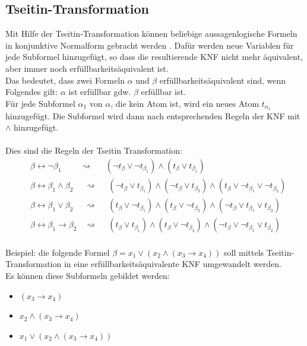 \documentclass[a4,abstract=on]{scrartcl}
\begin{document}
\subsection{Tseitin-Transformation}
Mit Hilfe der Tseitin-Transformation können beliebige aussagenlogische Formeln in konjunktive Normalform gebracht werden \cite [vgl.][]{tseitin}. Dafür werden neue Variablen für jede Subformel hinzugefügt, so dass die resultierende KNF nicht mehr äquivalent, aber immer noch erfüllbarkeitsäquivalent ist. \\
Das bedeutet, dass zwei Formeln $\alpha$ und $\beta$ erfüllbarkeitsäquivalent sind, wenn Folgendes gilt:
$\alpha$ ist erfüllbar gdw. $\beta$ erfüllbar ist.
\ \\
Für jede Subformel $\alpha_1$ von $\alpha$, die kein Atom ist, wird ein neues Atom $t_{\alpha_1}$ hinzugefügt. Die Subformel wird dann nach entsprechenden Regeln der KNF mit $\wedge$ hinzugefügt.\\
\ \\
Dies sind die Regeln der Tseitin Transformation:
\begin{align*}
&\beta \leftrightarrow\neg \beta_1 {~~~~~~~~~~}\rightsquigarrow{~~~~~~~} (\neg t_\beta \vee \neg t_{\beta_1 }) \wedge (t_\beta \vee t_{\beta_1})\\
&\beta \leftrightarrow \beta_1 \wedge \beta_2 {~~~~~~}\rightsquigarrow{~~~~~~} (\neg t_\beta \vee  t_{\beta_1 }) \wedge (\neg t_\beta \vee t_{\beta_2}) \wedge (t_\beta \vee \neg t_{\beta_1} \vee \neg t_{\beta_2})\\
&\beta \leftrightarrow \beta_1 \vee \beta_2 {~~~~~~}\rightsquigarrow{~~~~~~} (t_\beta \vee  \neg t_{\beta_1 }) \wedge (t_\beta \vee \neg t_{\beta_2}) \wedge (\neg t_\beta \vee t_{\beta_1} \vee t_{\beta_2})\\
&\beta \leftrightarrow \beta_1 \rightarrow \beta_2 {~~~~}\rightsquigarrow{~~~~~~} (t_\beta \vee  t_{\beta_1 }) \wedge (t_\beta \vee \neg t_{\beta_2}) \wedge (\neg t_\beta \vee \neg t_{\beta_1} \vee t_{\beta_2})
\end{align*}
\ \\
Beispiel: die folgende Formel $\beta = x_1 \vee (x_2 \wedge (x_3 \rightarrow x_4))$ soll mittels Tseitin-Transformation in eine erfüllbarkeitsäquivalente KNF umgewandelt werden.\\
Es können diese Subformeln gebildet werden:\\
\begin{itemize}
\item $(x_3 \rightarrow x_4)$
\item $x_2 \wedge (x_3 \rightarrow x_4)$
\item $x_1 \vee (x_2 \wedge (x_3 \rightarrow x_4))$
\end{itemize}
\end{document}
